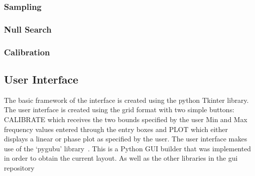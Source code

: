 \subsubsection{Sampling}
\subsubsection{Null Search}
\subsubsection{Calibration}
\subsection{User Interface}

The basic framework of the interface is created using the python Tkinter library. The user interface is created using the grid format with two simple buttons: CALIBRATE which receives the two bounds specified by the user  Min and Max frequency values entered through the entry boxes and PLOT which either displays a linear or phase plot as specified by the user.
The user interface makes use of the `pygubu' library~\cite{pygubu}.
This is a Python GUI builder that was implemented in order to obtain the current layout. As well as the other libraries in the gui repository
